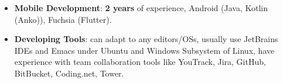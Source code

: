 \documentclass{resume}
\begin{document}
\begin{itemize}
  \item \textbf{Mobile Development}:
    \textbf{2 years} of experience,
    Android (Java, Kotlin (Anko)), Fuchsia (Flutter).

  \item \textbf{Developing Tools}:
    can adapt to any editors/OSs, usually use JetBrains IDEs and Emacs under Ubuntu
    and Windows Subsystem of Linux,
    have experience with team collaboration tools like YouTrack,
    Jira, GitHub, BitBucket, Coding.net, Tower.
\end{itemize}

\end{document}
